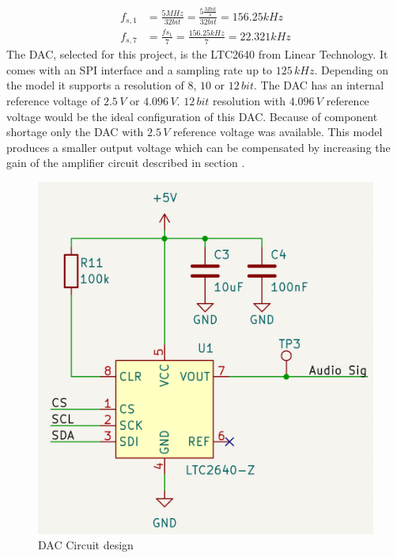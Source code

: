 %
\begin{align}
  f_{s,1} &= \frac{5MHz}{32bit} = \frac{5 \frac{Mbit}{s}}{32bit} = 156.25kHz \label{eq:pcb:dac_fs}\\[1em]
  f_{s, 7} &= \frac{fs_1}{7} = \frac{156.25kHz}{7} = 22.321kHz
\end{align}
%
The DAC, selected for this project, is the LTC2640 from Linear Technology. It comes with an SPI interface and a sampling rate up to $125\,kHz$. Depending on the model it supports a resolution of $8$, $10$ or $12\,bit$. The DAC has an internal reference voltage of $2.5\,V$ or $4.096\,V$. $12\,bit$ resolution with $4.096\,V$ reference voltage would be the ideal configuration of this DAC. Because of component shortage only the DAC with $2.5\,V$ reference voltage was available. This model produces a smaller output voltage which can be compensated by increasing the gain of the amplifier circuit described in section .\cite{linear_technology_ltc2640_2017}
%
\begin{figure}
  \centering
  \includegraphics[height=\mediumheight]{src/assets/pictures/circuit/dac_circuit.png}
  \caption{DAC Circuit design}\label{fig:pcb:dac_circuit}
\end{figure}